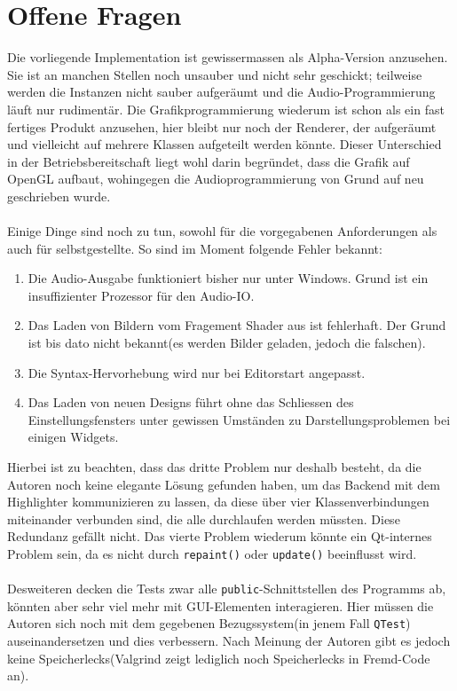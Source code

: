 \newpage

\section{Offene Fragen} \label{sec:WhatsNext}
	Die vorliegende Implementation ist gewissermassen als Alpha-Version anzusehen. Sie ist an manchen Stellen noch unsauber und nicht sehr geschickt; teilweise werden
    die Instanzen nicht sauber aufgeräumt und die Audio-Programmierung läuft nur rudimentär. Die Grafikprogrammierung wiederum ist schon als ein fast fertiges Produkt anzusehen,
    hier bleibt nur noch der Renderer, der aufgeräumt und vielleicht auf mehrere Klassen aufgeteilt werden könnte. Dieser Unterschied in der Betriebsbereitschaft liegt
    wohl darin begründet, dass die Grafik auf OpenGL aufbaut, wohingegen die Audioprogrammierung von Grund auf neu geschrieben wurde.
\paragraph{}
    Einige Dinge sind noch zu tun, sowohl für die vorgegabenen Anforderungen als auch für selbstgestellte. So sind im Moment folgende Fehler bekannt:
\begin{enumerate}\itemsep0pt
\item Die Audio-Ausgabe funktioniert bisher nur unter Windows. Grund ist ein insuffizienter Prozessor für den Audio-IO.
\item Das Laden von Bildern vom Fragement Shader aus ist fehlerhaft. Der Grund ist bis dato nicht bekannt(es werden Bilder geladen, jedoch die falschen).
\item Die Syntax-Hervorhebung wird nur bei Editorstart angepasst.
\item Das Laden von neuen Designs führt ohne das Schliessen des Einstellungsfensters unter gewissen Umständen zu Darstellungsproblemen bei einigen Widgets.
\end{enumerate}
    Hierbei ist zu beachten, dass das dritte Problem nur deshalb besteht, da die Autoren noch keine elegante Lösung gefunden haben, um das Backend mit dem Highlighter
    kommunizieren zu lassen, da diese über vier Klassenverbindungen miteinander verbunden sind, die alle durchlaufen werden müssten. Diese Redundanz gefällt nicht.
    Das vierte Problem wiederum könnte ein Qt-internes Problem sein, da es nicht durch \texttt{repaint()} oder \texttt{update()} beeinflusst wird.
\paragraph{}
    Desweiteren decken die Tests zwar alle \texttt{public}-Schnittstellen des Programms ab, könnten aber sehr viel mehr mit GUI-Elementen interagieren. Hier müssen
    die Autoren sich noch mit dem gegebenen Bezugssystem(in jenem Fall \texttt{QTest}) auseinandersetzen und dies verbessern. Nach Meinung der Autoren gibt es jedoch
    keine Speicherlecks(Valgrind zeigt lediglich noch Speicherlecks in Fremd-Code an).
